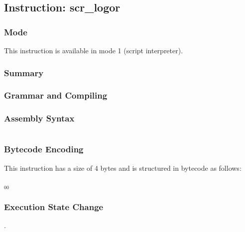 \subsection{Instruction: scr\_logor}

\subsubsection{Mode}
This instruction is available in mode 1 (script interpreter).
\subsubsection{Summary}


\subsubsection{Grammar and Compiling}


\subsubsection{Assembly Syntax}

\begin{myquote}
\begin{verbatim}

\end{verbatim}
\end{myquote}

\subsubsection{Bytecode Encoding}

This instruction has a size of 4 bytes and is structured in bytecode as follows:

$_{00}$\ 


\subsubsection{Execution State Change}

.


